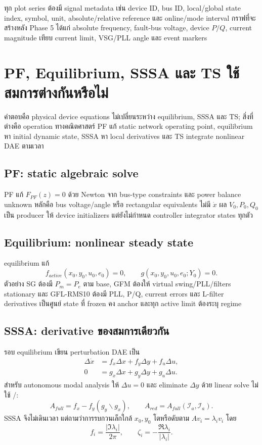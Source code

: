 \documentclass[12pt,a4paper]{article}
\newcommand{\code}[1]{\texttt{\detokenize{#1}}}
\begin{document}
ทุก plot series ต้องมี signal metadata เช่น device ID, bus ID, local/global state index,
symbol, unit, absolute/relative reference และ online/mode interval กราฟที่จะสร้างหลัง
Phase 5 ได้แก่ absolute frequency, fault-bus voltage, device $P/Q$, current magnitude
เทียบ current limit, VSG/PLL angle และ event markers

\section{PF, Equilibrium, SSSA และ TS ใช้สมการต่างกันหรือไม่}

คำตอบคือ physical device equations ไม่เปลี่ยนระหว่าง equilibrium, SSSA และ TS;
สิ่งที่ต่างคือ operation ทางคณิตศาสตร์ PF แก้ static network operating point,
equilibrium หา initial dynamic state, SSSA หา local derivatives และ TS integrate
nonlinear DAE ตามเวลา

\subsection{PF: static algebraic solve}

PF แก้ $F_{PF}(z)=0$ ด้วย Newton จาก bus-type constraints และ power balance
unknown หลักคือ bus voltage/angle หรือ rectangular equivalents ไม่มี $\dot x$
ผล $V_0,P_0,Q_0$ เป็น producer ให้ device initializers แต่ยังไม่กำหนด controller
integrator states ทุกตัว

\subsection{Equilibrium: nonlinear steady state}

equilibrium แก้
\begin{equation}
f_{active}(x_0,y_0,u_0,e_0)=0,\qquad
g(x_0,y_0,u_0,e_0;Y_0)=0.
\label{eq:equilibrium-full}
\end{equation}
ตัวอย่าง SG ต้องมี $P_m=P_e$ ตาม base, GFM ต้องให้ virtual swing/PLL/filters
stationary และ GFL-RMS10 ต้องมี PLL, P/Q, current errors และ L-filter derivatives
เป็นศูนย์ state ที่ frozen คง anchor และทุก active limit ต้องระบุ regime

\subsection{SSSA: derivative ของสมการเดียวกัน}

รอบ equilibrium เขียน perturbation DAE เป็น
\begin{align}
\Delta\dot x&=f_x\Delta x+f_y\Delta y+f_u\Delta u,\\
0&=g_x\Delta x+g_y\Delta y+g_u\Delta u.
\end{align}
สำหรับ autonomous modal analysis ให้ $\Delta u=0$ และ eliminate $\Delta y$ ด้วย
linear solve ไม่ใช้ \code{inv}/\code{pinv}:
\begin{equation}
A_{full}=f_x-f_y(g_y\backslash g_x),\qquad
A_{red}=A_{full}(\mathcal I_a,\mathcal I_a).
\end{equation}
SSSA จึงไม่เดินเวลา แต่ถามว่าการรบกวนเล็กใกล้ $x_0,y_0$ โตหรือดับตาม
$Av_i=\lambda_i v_i$ โดย
\begin{equation}
f_i=\frac{|\Im\lambda_i|}{2\pi},\qquad
\zeta_i=-\frac{\Re\lambda_i}{|\lambda_i|}.
\end{equation}
\end{document}
